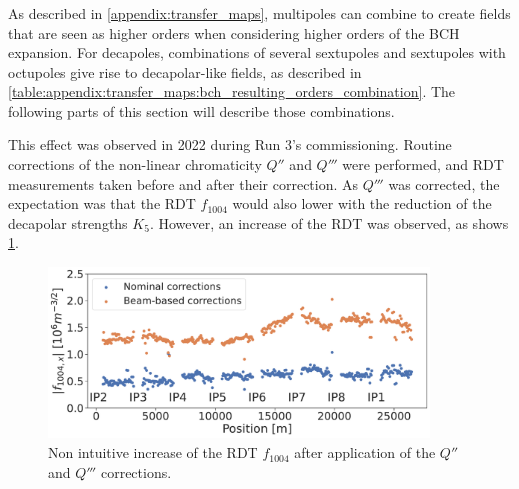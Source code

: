 
\subsubsection{}

As described in \cref{appendix:transfer_maps}, multipoles can combine to create fields that are seen
as higher orders when considering higher orders of the BCH expansion.
For decapoles, combinations of several sextupoles and sextupoles with octupoles give rise to
decapolar-like fields, as described in
\cref{table:appendix:transfer_maps:bch_resulting_orders_combination}. The following parts of this
section will describe those combinations.

This effect was observed in 2022 during Run 3's commissioning. Routine corrections of the non-linear
chromaticity $Q''$ and $Q'''$ were performed, and RDT measurements taken before and after their
correction. As $Q'''$ was corrected, the expectation was that the RDT $f_{1004}$ would also lower
with the reduction of the decapolar strengths $K_5$. However, an increase of the RDT was observed,
as shows \cref{fig:decapoles:f1004_dq2_dq3}.

\begin{figure}[H]
    \centering
    \includegraphics[width=0.9\textwidth]{./images/f1004_dq2_dq3_2022.pdf}    
    \caption{Non intuitive increase of the RDT $f_{1004}$ after application of the $Q''$ and $Q'''$
    corrections.}
    \label{fig:decapoles:f1004_dq2_dq3}
\end{figure}


\subsubsection{}

